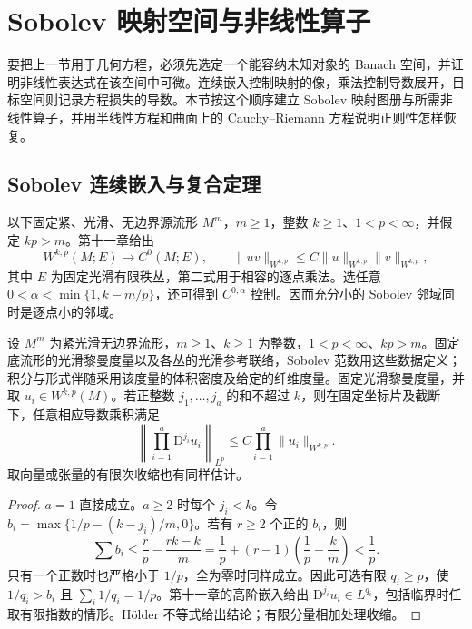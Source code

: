 
% 
% 
% 
% 
% 
% 

\section{Sobolev 映射空间与非线性算子}
\label{g3:sec:1306}

要把上一节用于几何方程，必须先选定一个能容纳未知对象的 Banach 空间，并证明非线性表达式在该空间中可微。连续嵌入控制映射的像，乘法控制导数展开，目标空间则记录方程损失的导数。本节按这个顺序建立 Sobolev 映射图册与所需非线性算子，并用半线性方程和曲面上的 Cauchy--Riemann 方程说明正则性怎样恢复。

\subsection{Sobolev 连续嵌入与复合定理}
\label{g3:subsec:1306:01}
以下固定紧、光滑、无边界源流形 \(M^m\)，\(m\ge1\)，整数 \(k\ge1\)、\(1<p<\infty\)，并假定 \(kp>m\)。第十一章给出
\[
	W^{k,p}(M;E)\longrightarrow C^0(M;E),\qquad
	\|uv\|_{W^{k,p}}\le C\|u\|_{W^{k,p}}\|v\|_{W^{k,p}},
\]
其中 \(E\) 为固定光滑有限秩丛，第二式用于相容的逐点乘法。选任意 \(0<\alpha<\min\{1,k-m/p\}\)，还可得到 \(C^{0,\alpha}\) 控制。因而充分小的 Sobolev 邻域同时是逐点小的邻域。

\begin{lemma}\label{g3:lem:sobolev-multiple-products}
	设 \(M^m\) 为紧光滑无边界流形，\(m\ge1\)、\(k\ge1\) 为整数，\(1<p<\infty\)、\(kp>m\)。固定底流形的光滑黎曼度量以及各丛的光滑参考联络，Sobolev 范数用这些数据定义；积分与形式伴随采用该度量的体积密度及给定的纤维度量。固定光滑黎曼度量，并取 \(u_i\in W^{k,p}(M)\)。若正整数 \(j_1,\ldots,j_a\) 的和不超过 \(k\)，则在固定坐标片及截断下，任意相应导数乘积满足
	\[
		\left\|\prod_{i=1}^a\mathrm D^{j_i}u_i\right\|_{L^p}
		\le C\prod_{i=1}^a\|u_i\|_{W^{k,p}}.
	\]
	取向量或张量的有限次收缩也有同样估计。
\end{lemma}
\begin{proof}
	\(a=1\) 直接成立。\(a\ge2\) 时每个 \(j_i<k\)。令
	\(b_i=\max\{1/p-(k-j_i)/m,0\}\)。若有 \(r\ge2\) 个正的 \(b_i\)，则
	\[
		\sum b_i\le\frac rp-\frac{rk-k}{m}
		=\frac1p+(r-1)\left(\frac1p-\frac km\right)<\frac1p.
	\]
	只有一个正数时也严格小于 \(1/p\)，全为零时同样成立。因此可选有限 \(q_i\ge p\)，使 \(1/q_i>b_i\) 且 \(\sum_i1/q_i=1/p\)。第十一章的高阶嵌入给出 \(\mathrm D^{j_i}u_i\in L^{q_i}\)，包括临界时任取有限指数的情形。Hölder 不等式给出结论；有限分量相加处理收缩。
\end{proof}

